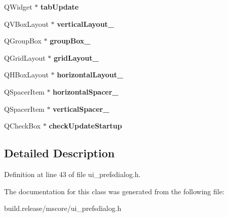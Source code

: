 \begin{DoxyCompactItemize}
Q\+Widget $\ast$ {\bfseries tab\+Update}
\item 
\mbox{\label{class_ui___prefs_dialog_base_a911197b8d240140c977ce3538f664579}} 
Q\+V\+Box\+Layout $\ast$ {\bfseries vertical\+Layout\+\_}
\item 
\mbox{\label{class_ui___prefs_dialog_base_a1a5ef4f23f8200ceb97af251dd6fb75b}} 
Q\+Group\+Box $\ast$ {\bfseries group\+Box\+\_}
\item 
\mbox{\label{class_ui___prefs_dialog_base_adb38bc8cf4b0f1a62dfa346c54378fe2}} 
Q\+Grid\+Layout $\ast$ {\bfseries grid\+Layout\+\_}
\item 
\mbox{\label{class_ui___prefs_dialog_base_a9233902994aacfc759c4113b7bc09105}} 
Q\+H\+Box\+Layout $\ast$ {\bfseries horizontal\+Layout\+\_}
\item 
\mbox{\label{class_ui___prefs_dialog_base_a33ddd33c810cc19154d9d93160fac36e}} 
Q\+Spacer\+Item $\ast$ {\bfseries horizontal\+Spacer\+\_}
\item 
\mbox{\label{class_ui___prefs_dialog_base_a26ab2ead4bfecacb62d7d983a202cb82}} 
Q\+Spacer\+Item $\ast$ {\bfseries vertical\+Spacer\+\_}
\item 
\mbox{\label{class_ui___prefs_dialog_base_ac85160d0bc7f5457912ea7962c9b95f8}} 
Q\+Check\+Box $\ast$ {\bfseries check\+Update\+Startup}
\end{DoxyCompactItemize}


\subsection{Detailed Description}


Definition at line 43 of file ui\+\_\+prefsdialog.\+h.



The documentation for this class was generated from the following file\+:\begin{DoxyCompactItemize}
\item 
build.\+release/mscore/ui\+\_\+prefsdialog.\+h\end{DoxyCompactItemize}
